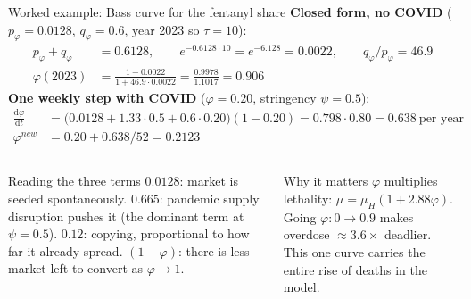 ﻿\documentclass[9pt,aspectratio=169]{beamer}
\newcommand{\dd}{\mathrm d}
\begin{document}

\begin{frame}{Worked example: Bass curve for the fentanyl share}
 \textbf{Closed form, no COVID} ($p_\varphi=0.0128$, $q_\varphi=0.6$, year 2023 so $\tau=10$):
 \begin{align*}
  p_\varphi+q_\varphi&=0.6128,\qquad e^{-0.6128\cdot10}=e^{-6.128}=0.0022,\qquad q_\varphi/p_\varphi=46.9\\
  \varphi(2023)&=\frac{1-0.0022}{1+46.9\cdot0.0022}=\frac{0.9978}{1.1017}=\mathbf{0.906}
 \end{align*}
 \textbf{One weekly step with COVID} ($\varphi=0.20$, stringency $\psi=0.5$):
 \begin{align*}
  \frac{\dd\varphi}{\dd t}&=\big(0.0128+1.33\cdot0.5+0.6\cdot0.20\big)(1-0.20)=0.798\cdot0.80=0.638\ \text{per year}\\
  \varphi^{new}&=0.20+0.638/52=0.2123
 \end{align*}
 \begin{columns}[T]
 \begin{block}{Reading the three terms}\small
  $0.0128$: market is seeded spontaneously. $0.665$: pandemic supply disruption pushes it (the dominant term at $\psi=0.5$). $0.12$: copying, proportional to how far it already spread. $(1-\varphi)$: there is less market left to convert as $\varphi\to1$.
 \end{block}
 \begin{block}{Why it matters}\small
  $\varphi$ multiplies lethality: $\mu=\mu_H(1+2.88\varphi)$. Going $\varphi:0\to0.9$ makes overdose $\approx3.6\times$ deadlier. This one curve carries the entire rise of deaths in the model.
 \end{block}
 \end{columns}
\end{frame}
\end{document}
